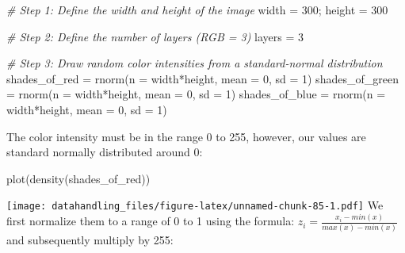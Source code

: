 \documentclass[
  12pt,
]{style/krantz}
\newenvironment{Shaded}{\begin{snugshade}}{\end{snugshade}}
\newcommand{\AttributeTok}[1]{\textcolor[rgb]{0.77,0.63,0.00}{#1}}
\newcommand{\CommentTok}[1]{\textcolor[rgb]{0.56,0.35,0.01}{\textit{#1}}}
\newcommand{\DecValTok}[1]{\textcolor[rgb]{0.00,0.00,0.81}{#1}}
\newcommand{\FunctionTok}[1]{\textcolor[rgb]{0.00,0.00,0.00}{#1}}
\newcommand{\NormalTok}[1]{#1}
\newcommand{\OtherTok}[1]{\textcolor[rgb]{0.56,0.35,0.01}{#1}}
\newcommand{\SpecialCharTok}[1]{\textcolor[rgb]{0.00,0.00,0.00}{#1}}
\begin{document}
\begin{Shaded}
\begin{Highlighting}[]
\CommentTok{\# Step 1: Define the width and height of the image}
\NormalTok{width }\OtherTok{=} \DecValTok{300}\NormalTok{; }
\NormalTok{height }\OtherTok{=} \DecValTok{300}

\CommentTok{\# Step 2: Define the number of layers (RGB = 3)}
\NormalTok{layers }\OtherTok{=} \DecValTok{3}

\CommentTok{\# Step 3: Draw random color intensities from a standard{-}normal distribution}
\NormalTok{shades\_of\_red }\OtherTok{=} \FunctionTok{rnorm}\NormalTok{(}\AttributeTok{n =}\NormalTok{ width}\SpecialCharTok{*}\NormalTok{height, }\AttributeTok{mean =} \DecValTok{0}\NormalTok{, }\AttributeTok{sd =} \DecValTok{1}\NormalTok{)}
\NormalTok{shades\_of\_green }\OtherTok{=} \FunctionTok{rnorm}\NormalTok{(}\AttributeTok{n =}\NormalTok{ width}\SpecialCharTok{*}\NormalTok{height, }\AttributeTok{mean =} \DecValTok{0}\NormalTok{, }\AttributeTok{sd =} \DecValTok{1}\NormalTok{)}
\NormalTok{shades\_of\_blue }\OtherTok{=} \FunctionTok{rnorm}\NormalTok{(}\AttributeTok{n =}\NormalTok{ width}\SpecialCharTok{*}\NormalTok{height, }\AttributeTok{mean =} \DecValTok{0}\NormalTok{, }\AttributeTok{sd =} \DecValTok{1}\NormalTok{)}
\end{Highlighting}
\end{Shaded}

The color intensity must be in the range 0 to 255, however, our values are
standard normally distributed around 0:

\begin{Shaded}
\begin{Highlighting}[]
\FunctionTok{plot}\NormalTok{(}\FunctionTok{density}\NormalTok{(shades\_of\_red))}
\end{Highlighting}
\end{Shaded}

\texttt{[image: datahandling\_files/figure-latex/unnamed-chunk-85-1.pdf]}
We first normalize them to a range of 0 to 1 using the formula:
\(z_i = \frac{x_i - min(x)}{max(x)-min(x)}\)
and subsequently multiply by 255:
\end{document}

